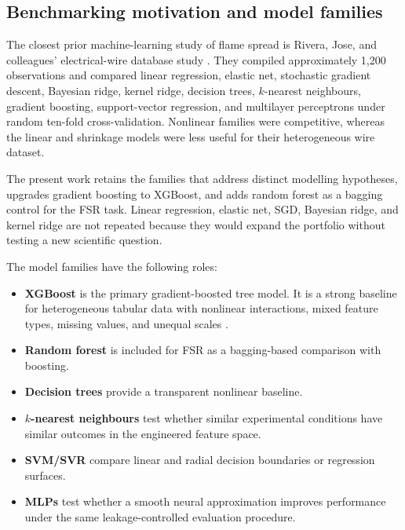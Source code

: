 \subsection{Benchmarking motivation and model families}

The closest prior machine-learning study of flame spread is Rivera, Jose, and
colleagues' electrical-wire database study \cite{riveraWireML}. They compiled
approximately 1,200 observations and compared linear regression, elastic net,
stochastic gradient descent, Bayesian ridge, kernel ridge, decision trees,
\(k\)-nearest neighbours, gradient boosting, support-vector regression, and
multilayer perceptrons under random ten-fold cross-validation. Nonlinear
families were competitive, whereas the linear and shrinkage models were less
useful for their heterogeneous wire dataset.

The present work retains the families that address distinct modelling
hypotheses, upgrades gradient boosting to XGBoost, and adds random forest as a
bagging control for the FSR task. Linear regression, elastic net, SGD, Bayesian
ridge, and kernel ridge are not repeated because they would expand the
portfolio without testing a new scientific question.

The model families have the following roles:

\begin{itemize}
  \item \textbf{XGBoost} is the primary gradient-boosted tree model. It is a
  strong baseline for heterogeneous tabular data with nonlinear interactions,
  mixed feature types, missing values, and unequal scales
  \cite{shwartzZiv2022tabular,chenGuestrin2016}.

  \item \textbf{Random forest} is included for FSR as a bagging-based
  comparison with boosting.

  \item \textbf{Decision trees} provide a transparent nonlinear baseline.

  \item \textbf{\(k\)-nearest neighbours} test whether similar experimental
  conditions have similar outcomes in the engineered feature space.

  \item \textbf{SVM/SVR} compare linear and radial decision boundaries or
  regression surfaces.

  \item \textbf{MLPs} test whether a smooth neural approximation improves
  performance under the same leakage-controlled evaluation procedure.
\end{itemize}

